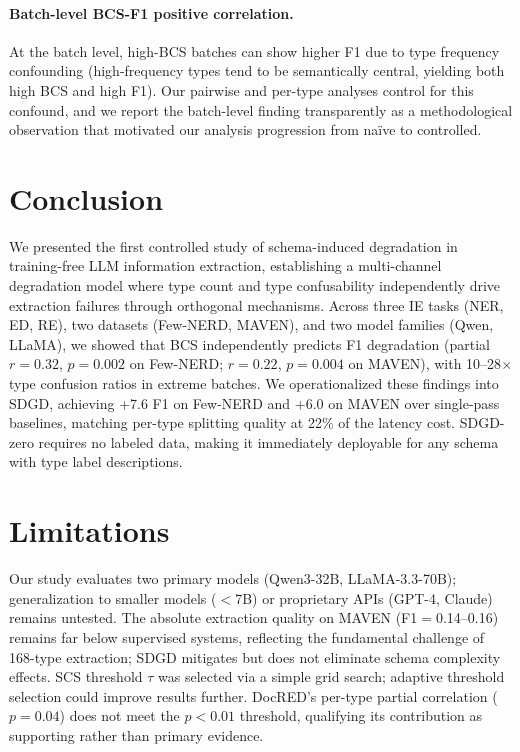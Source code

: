 \documentclass[11pt,a4paper]{article}
\begin{document}
\paragraph{Batch-level BCS-F1 positive correlation.}
At the batch level, high-BCS batches can show higher F1 due to type frequency confounding (high-frequency types tend to be semantically central, yielding both high BCS and high F1).
Our pairwise and per-type analyses control for this confound, and we report the batch-level finding transparently as a methodological observation that motivated our analysis progression from na\"ive to controlled.

\section{Conclusion}
\label{sec:conclusion}

We presented the first controlled study of schema-induced degradation in training-free LLM information extraction, establishing a multi-channel degradation model where type count and type confusability independently drive extraction failures through orthogonal mechanisms.
Across three IE tasks (NER, ED, RE), two datasets (Few-NERD, MAVEN), and two model families (Qwen, LLaMA), we showed that BCS independently predicts F1 degradation (partial $r{=}0.32$, $p{=}0.002$ on Few-NERD; $r{=}0.22$, $p{=}0.004$ on MAVEN), with 10--28$\times$ type confusion ratios in extreme batches.
We operationalized these findings into SDGD, achieving +7.6 F1 on Few-NERD and +6.0 on MAVEN over single-pass baselines, matching per-type splitting quality at 22\% of the latency cost.
SDGD-zero requires no labeled data, making it immediately deployable for any schema with type label descriptions.

\section*{Limitations}

Our study evaluates two primary models (Qwen3-32B, LLaMA-3.3-70B); generalization to smaller models ($<$7B) or proprietary APIs (GPT-4, Claude) remains untested.
The absolute extraction quality on MAVEN (F1$=$0.14--0.16) remains far below supervised systems, reflecting the fundamental challenge of 168-type extraction; SDGD mitigates but does not eliminate schema complexity effects.
SCS threshold $\tau$ was selected via a simple grid search; adaptive threshold selection could improve results further.
DocRED's per-type partial correlation ($p{=}0.04$) does not meet the $p{<}0.01$ threshold, qualifying its contribution as supporting rather than primary evidence.



\end{document}
